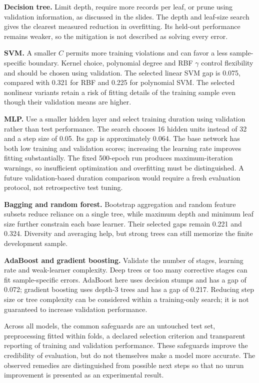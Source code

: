 \textbf{Decision tree.} Limit depth, require more records per leaf, or prune using validation information, as discussed in the slides. The depth and leaf-size search gives the clearest measured reduction in overfitting. Its held-out performance remains weaker, so the mitigation is not described as solving every error.

\textbf{SVM.} A smaller $C$ permits more training violations and can favor a less sample-specific boundary. Kernel choice, polynomial degree and RBF $\gamma$ control flexibility and should be chosen using validation. The selected linear SVM gap is 0.075, compared with 0.321 for RBF and 0.225 for polynomial SVM. The selected nonlinear variants retain a risk of fitting details of the training sample even though their validation means are higher.

\textbf{MLP.} Use a smaller hidden layer and select training duration using validation rather than test performance. The search chooses 16 hidden units instead of 32 and a step size of 0.05. Its gap is approximately 0.064. The base network has both low training and validation scores; increasing the learning rate improves fitting substantially. The fixed 500-epoch run produces maximum-iteration warnings, so insufficient optimization and overfitting must be distinguished. A future validation-based duration comparison would require a fresh evaluation protocol, not retrospective test tuning.

\textbf{Bagging and random forest.} Bootstrap aggregation and random feature subsets reduce reliance on a single tree, while maximum depth and minimum leaf size further constrain each base learner. Their selected gaps remain 0.221 and 0.324. Diversity and averaging help, but strong trees can still memorize the finite development sample.

\textbf{AdaBoost and gradient boosting.} Validate the number of stages, learning rate and weak-learner complexity. Deep trees or too many corrective stages can fit sample-specific errors. AdaBoost here uses decision stumps and has a gap of 0.072; gradient boosting uses depth-3 trees and has a gap of 0.217. Reducing step size or tree complexity can be considered within a training-only search; it is not guaranteed to increase validation performance.

Across all models, the common safeguards are an untouched test set, preprocessing fitted within folds, a declared selection criterion and transparent reporting of training and validation performance. These safeguards improve the credibility of evaluation, but do not themselves make a model more accurate. The observed remedies are distinguished from possible next steps so that no unrun improvement is presented as an experimental result.

